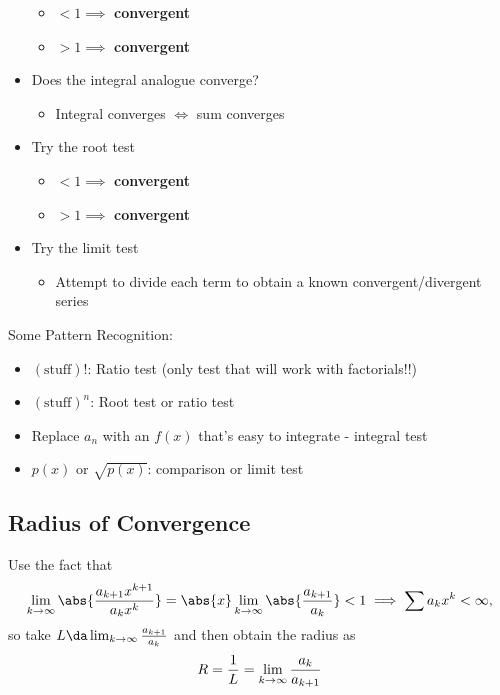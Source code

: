 \begin{itemize}
  \begin{itemize}
  \tightlist
  \item
    \(<1 \implies\) \textbf{convergent}
  \item
    \(>1 \implies\) \textbf{convergent}
  \end{itemize}
\item
  Does the integral analogue converge?

  \begin{itemize}
  \tightlist
  \item
    Integral converges \(\iff\) sum converges
  \end{itemize}
\item
  Try the root test

  \begin{itemize}
  \tightlist
  \item
    \(<1 \implies\) \textbf{convergent}
  \item
    \(>1 \implies\) \textbf{convergent}
  \end{itemize}
\item
  Try the limit test

  \begin{itemize}
  \tightlist
  \item
    Attempt to divide each term to obtain a known convergent/divergent
    series
  \end{itemize}
\end{itemize}

Some Pattern Recognition:

\begin{itemize}
\tightlist
\item
  \((\text{stuff})!\): Ratio test (only test that will work with
  factorials!!)
\item
  \((\text{stuff})^n\): Root test or ratio test
\item
  Replace \(a_n\) with an \(f(x)\) that's easy to integrate - integral
  test
\item
  \(p(x)\) or \(\sqrt{p(x)}\): comparison or limit test
\end{itemize}

\hypertarget{radius-of-convergence}{%
\subsection{Radius of Convergence}\label{radius-of-convergence}}

\begin{proposition}

Use the fact that
\begin{align*}
\lim_{k\to\infty} \abs{\frac{a_{k+1}x^{k+1}}{a_kx^k}} 
= \abs{x}\lim_{k\to\infty} \abs{\frac{a_{k+1}}{a_k}} < 1 
\implies \sum a_k x^k < \infty
,\end{align*} so take \(L \da \lim_{k\to\infty} \frac{a_{k+1}}{a_k}\)
and then obtain the radius as
\begin{align*}
R = \frac{1}{L} = \lim_{k\to\infty} {a_k \over a_{k+1}}
\end{align*}

\end{proposition}

